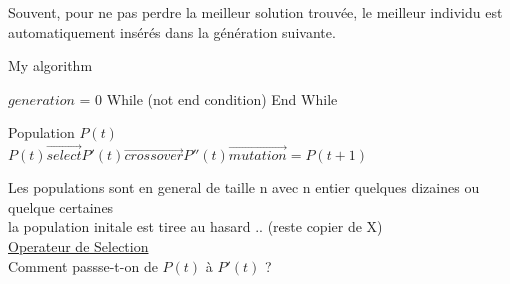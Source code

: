 Souvent, pour ne pas perdre la meilleur solution trouv\'ee, le meilleur individu est automatiquement ins\'er\'es dans la g\'en\'eration suivante.




\begin{algorithm}
\caption{My algorithm}\label{euclid}
\begin{algorithmic}[1]
\State $\textit{generation = 0}$
\State While (not end condition)
\State 	\hspace{2cm}{$generation\ +=1$}
\State  \hspace{2cm}{compute fitness of each individual}
\State  \hspace{2cm}{select individual}
\State  \hspace{2cm}{crossover}
\State  \hspace{2cm}{mutation}
\State End While
\end{algorithmic}
\end{algorithm}

Population $P(t)$ \\
$P(t)  \overrightarrow{select} P'(t) \overrightarrow{crossover} P''(t)\overrightarrow{mutation} = P(t+1)$

Les populations sont en general de taille n avec n entier quelques dizaines ou quelque certaines\\
la population initale est tiree au hasard .. (reste copier de X)\\

\underline{Operateur de Selection}\\
Comment passse-t-on de $P(t)$ \`a $P'(t)$ ?\\

